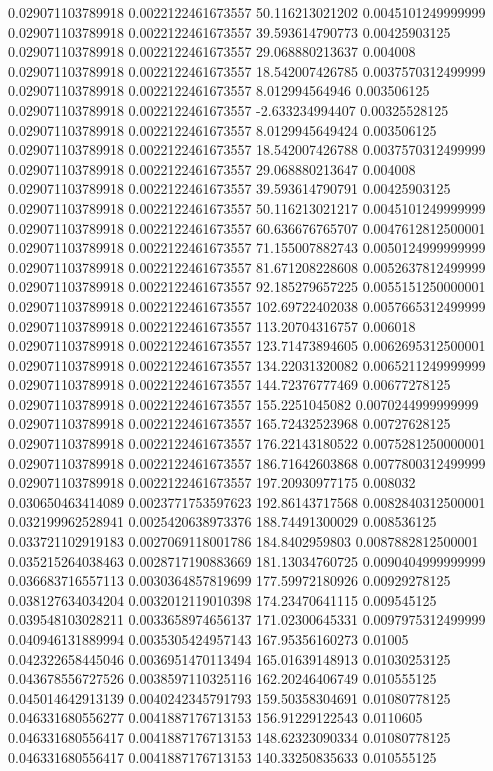 0.029071103789918 0.0022122461673557 50.116213021202 0.0045101249999999
0.029071103789918 0.0022122461673557 39.593614790773 0.00425903125
0.029071103789918 0.0022122461673557 29.068880213637 0.004008
0.029071103789918 0.0022122461673557 18.542007426785 0.0037570312499999
0.029071103789918 0.0022122461673557 8.012994564946 0.003506125
0.029071103789918 0.0022122461673557 -2.633234994407 0.00325528125
0.029071103789918 0.0022122461673557 8.0129945649424 0.003506125
0.029071103789918 0.0022122461673557 18.542007426788 0.0037570312499999
0.029071103789918 0.0022122461673557 29.068880213647 0.004008
0.029071103789918 0.0022122461673557 39.593614790791 0.00425903125
0.029071103789918 0.0022122461673557 50.116213021217 0.0045101249999999
0.029071103789918 0.0022122461673557 60.636676765707 0.0047612812500001
0.029071103789918 0.0022122461673557 71.155007882743 0.0050124999999999
0.029071103789918 0.0022122461673557 81.671208228608 0.0052637812499999
0.029071103789918 0.0022122461673557 92.185279657225 0.0055151250000001
0.029071103789918 0.0022122461673557 102.69722402038 0.0057665312499999
0.029071103789918 0.0022122461673557 113.20704316757 0.006018
0.029071103789918 0.0022122461673557 123.71473894605 0.0062695312500001
0.029071103789918 0.0022122461673557 134.22031320082 0.0065211249999999
0.029071103789918 0.0022122461673557 144.72376777469 0.00677278125
0.029071103789918 0.0022122461673557 155.2251045082 0.0070244999999999
0.029071103789918 0.0022122461673557 165.72432523968 0.00727628125
0.029071103789918 0.0022122461673557 176.22143180522 0.0075281250000001
0.029071103789918 0.0022122461673557 186.71642603868 0.0077800312499999
0.029071103789918 0.0022122461673557 197.20930977175 0.008032
0.030650463414089 0.0023771753597623 192.86143717568 0.0082840312500001
0.032199962528941 0.0025420638973376 188.74491300029 0.008536125
0.033721102919183 0.0027069118001786 184.8402959803 0.0087882812500001
0.035215264038463 0.0028717190883669 181.13034760725 0.0090404999999999
0.036683716557113 0.0030364857819699 177.59972180926 0.00929278125
0.038127634034204 0.0032012119010398 174.23470641115 0.009545125
0.039548103028211 0.0033658974656137 171.02300645331 0.0097975312499999
0.040946131889994 0.0035305424957143 167.95356160273 0.01005
0.042322658445046 0.0036951470113494 165.01639148913 0.01030253125
0.043678556727526 0.0038597110325116 162.20246406749 0.010555125
0.045014642913139 0.0040242345791793 159.50358304691 0.01080778125
0.046331680556277 0.0041887176713153 156.91229122543 0.0110605
0.046331680556417 0.0041887176713153 148.62323090334 0.01080778125
0.046331680556417 0.0041887176713153 140.33250835633 0.010555125
